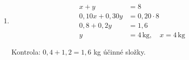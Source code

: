 \documentclass[11pt,a4paper]{article}
\begin{document}
\begin{zadaniReseniBox}[title={Domácí úkol}]
\begin{enumerate}[label=\alph*),itemsep=1pt]
\[\begin{aligned}
x&=7,\quad y=5 \\
K&=\{[7;5]\}
\end{aligned}\]\par Zkouška: $7\cdot150+5\cdot90=1500$ Kč.
\item
\[\begin{aligned}
x+y&=8 \\
0{,}10x+0{,}30y&=0{,}20\cdot8 \\
0{,}8+0{,}2y&=1{,}6 \\
y&=4\,\mathrm{kg},\quad x=4\,\mathrm{kg}
\end{aligned}\]\par Kontrola: $0{,}4+1{,}2=1{,}6$ kg účinné složky.
\end{enumerate}
\end{zadaniReseniBox}
\end{document}
